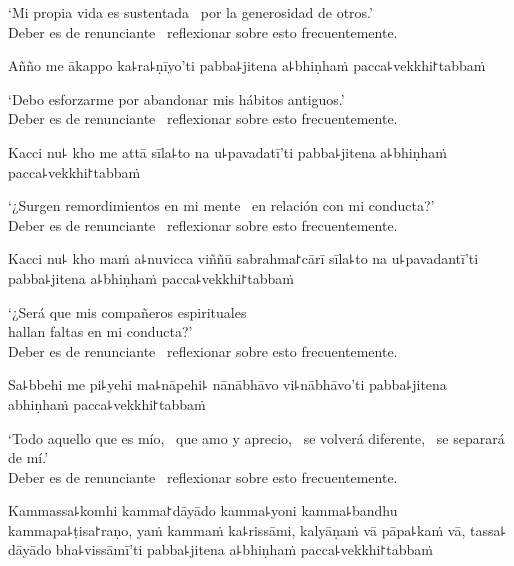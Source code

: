 \begin{english}
  ‘Mi propia vida es sustentada \pause\ por la generosidad de otros.’ \pause\\
  Deber es de renunciante \pause\ reflexionar sobre esto frecuentemente.
\end{english}

Añño me ākappo ka꜕ra꜕ṇīyo'ti pabba꜕jitena a꜕bhiṇhaṁ pacca꜕vekkhi꜓tabbaṁ

\begin{english}
  ‘Debo esforzarme por abandonar mis hábitos antiguos.’ \pause\\
  Deber es de renunciante \pause\ reflexionar sobre esto frecuentemente.
\end{english}

\clearpage

Kacci nu꜕ kho me attā sīla꜕to na u꜕pavadatī'ti pabba꜕jitena a꜕bhiṇhaṁ pacca꜕vekkhi꜓tabbaṁ

\begin{english}
  ‘¿Surgen remordimientos en mi mente \pause\ en relación con mi conducta?’ \pause\\
  Deber es de renunciante \pause\ reflexionar sobre esto frecuentemente.
\end{english}

Kacci nu꜕ kho maṁ a꜕nuvicca viññū sabrahma꜓cārī sīla꜕to na u꜕pavadantī'ti pabba꜕jitena a꜕bhiṇhaṁ pacca꜕vekkhi꜓tabbaṁ

\begin{english}
  ‘¿Será que mis compañeros espirituales \pause\\
  hallan faltas en mi conducta?’ \pause\\
  Deber es de renunciante \pause\ reflexionar sobre esto frecuentemente.
\end{english}

Sa꜕bbehi me pi꜕yehi ma꜕nāpehi꜕ nānābhāvo vi꜕nābhāvo'ti pabba꜕jitena abhiṇhaṁ pacca꜕vekkhi꜓tabbaṁ

\begin{english}
  ‘Todo aquello que es mío, \pause\ que amo y aprecio, \pause\ se volverá diferente, \pause\ se separará de mí.’ \pause\\
  Deber es de renunciante \pause\ reflexionar sobre esto frecuentemente.
\end{english}

Kammassa꜕komhi kamma꜓dāyādo kamma꜕yoni kamma꜕bandhu kammapa꜕ṭisa꜓raṇo, yaṁ kammaṁ ka꜕rissāmi, kalyāṇaṁ vā pāpa꜕kaṁ vā, tassa꜕ dāyādo bha꜕vissāmī'ti pabba꜕jitena a꜕bhiṇhaṁ pacca꜕vekkhi꜓tabbaṁ

